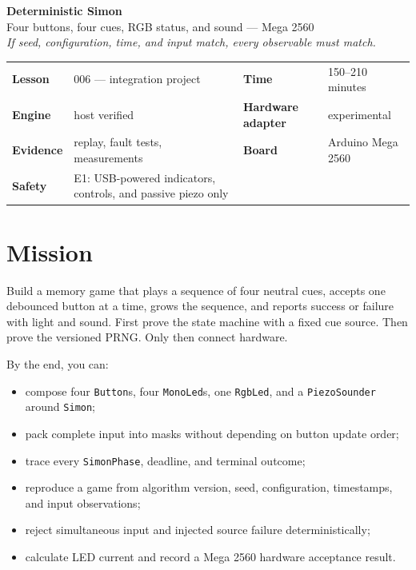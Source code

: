 \documentclass[11pt]{article}
\begin{document}
\begin{center}
  {\Huge\bfseries Deterministic Simon}\\[4pt]
  {\Large Four buttons, four cues, RGB status, and sound --- Mega 2560}\\[8pt]
  \textit{If seed, configuration, time, and input match, every observable must match.}
\end{center}

\begin{tabularx}{\linewidth}{@{}>{\bfseries}l X >{\bfseries}l X@{}}
Lesson & 006 --- integration project & Time & 150--210 minutes\\
Engine & host verified & Hardware adapter & experimental\\
Evidence & replay, fault tests, measurements & Board & Arduino Mega 2560\\
Safety & E1: USB-powered indicators, controls, and passive piezo only\\
\end{tabularx}

\section{Mission}

Build a memory game that plays a sequence of four neutral cues, accepts one
debounced button at a time, grows the sequence, and reports success or failure
with light and sound. First prove the state machine with a fixed cue source.
Then prove the versioned PRNG. Only then connect hardware.

By the end, you can:

\begin{itemize}
  \item compose four \texttt{Button}s, four \texttt{MonoLed}s, one
        \texttt{RgbLed}, and a \texttt{PiezoSounder} around \texttt{Simon};
  \item pack complete input into masks without depending on button update order;
  \item trace every \texttt{SimonPhase}, deadline, and terminal outcome;
  \item reproduce a game from algorithm version, seed, configuration, timestamps,
        and input observations;
  \item reject simultaneous input and injected source failure deterministically;
  \item calculate LED current and record a Mega 2560 hardware acceptance result.
\end{itemize}
\end{document}
